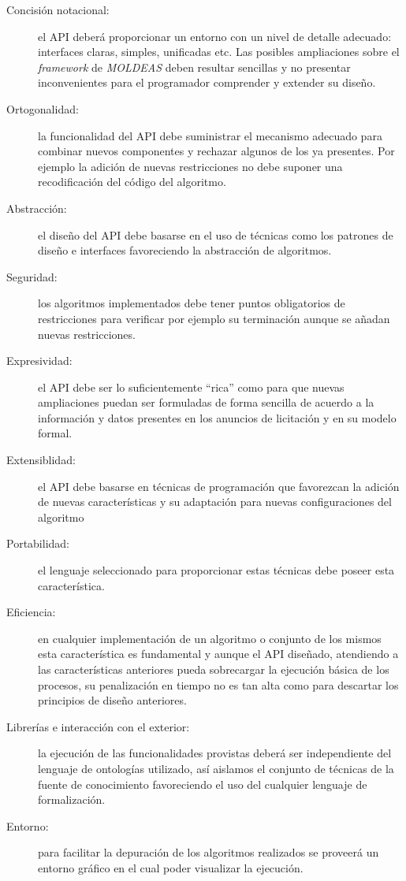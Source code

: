\begin{description}
\item[Concisión notacional:] el API deberá proporcionar un entorno con un nivel
de detalle adecuado: interfaces claras, simples, unificadas etc. Las posibles 
ampliaciones sobre el \textit{framework} de \textit{MOLDEAS} deben resultar sencillas
y no presentar inconvenientes para el programador comprender y extender su diseño.

\item[Ortogonalidad:] la funcionalidad del API debe suministrar el mecanismo
adecuado para combinar nuevos componentes y rechazar algunos de los ya
presentes. Por ejemplo la adición de nuevas restricciones no debe suponer una
recodificación del código del algoritmo.

\item[Abstracción:] el diseño del API debe basarse en el uso de técnicas como
los patrones de diseño e interfaces favoreciendo la abstracción de algoritmos.

\item[Seguridad:] los algoritmos implementados debe tener puntos obligatorios de restricciones
para verificar por ejemplo su terminación aunque se añadan nuevas
restricciones. 

\item[Expresividad:] el API debe ser lo suficientemente ``rica'' como para que
nuevas ampliaciones puedan ser formuladas de forma sencilla de acuerdo a la información 
y datos presentes en los anuncios de licitación y en su modelo formal. 

\item[Extensiblidad:] el API debe basarse en técnicas de programación que
favorezcan la adición de nuevas características y su adaptación para nuevas
configuraciones del algoritmo


\item[Portabilidad:] el lenguaje seleccionado para proporcionar estas técnicas
debe poseer esta característica.

\item[Eficiencia:] en cualquier implementación de un algoritmo o conjunto de los mismos esta característica es fundamental y
aunque el API diseñado, atendiendo a las características anteriores pueda
sobrecargar la ejecución básica de los procesos, su penalización en tiempo no es tan alta 
como para descartar los principios de diseño anteriores.

\item[Librerías e interacción con el exterior:] la ejecución de las funcionalidades 
provistas deberá ser independiente del lenguaje de ontologías utilizado, así aislamos el
conjunto de técnicas de la fuente de conocimiento favoreciendo el uso del
cualquier lenguaje de formalización.

\item[Entorno:] para facilitar la depuración de los algoritmos realizados se
proveerá un entorno gráfico en el cual poder visualizar la ejecución.
\end{description}

